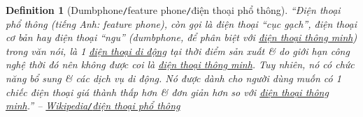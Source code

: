 \documentclass[12pt,twoside]{book}
\newtheorem{definition}{Definition}[section]
\begin{document}
\begin{definition}[Dumbphone{\tt/}feature phone{\tt/}điện thoại phổ thông]
	\label{def: dumbphone}
	``\emph{Điện thoại phổ thông} (tiếng Anh: \emph{feature phone}), còn gọi là điện thoại ``cục gạch'', điện thoại cơ bản hay điện thoại ``ngu'' (\emph{dumbphone}, để phân biệt với \href{https://vi.wikipedia.org/wiki/%C4%90i%E1%BB%87n_tho%E1%BA%A1i_th%C3%B4ng_minh}{điện thoại thông minh}) trong văn nói, là 1 \href{https://vi.wikipedia.org/wiki/%C4%90i%E1%BB%87n_tho%E1%BA%A1i_di_%C4%91%E1%BB%99ng}{điện thoại di động} tại thời điểm sản xuất \& do giới hạn công nghệ thời đó nên không được coi là \href{https://vi.wikipedia.org/wiki/%C4%90i%E1%BB%87n_tho%E1%BA%A1i_th%C3%B4ng_minh}{điện thoại thông minh}. Tuy nhiên, nó có chức năng bổ sung \& các dịch vụ di động. Nó được dành cho người dùng muốn có 1 chiếc điện thoại giá thành thấp hơn \& đơn giản hơn so với \href{https://vi.wikipedia.org/wiki/%C4%90i%E1%BB%87n_tho%E1%BA%A1i_th%C3%B4ng_minh}{điện thoại thông minh}.'' -- \href{https://vi.wikipedia.org/wiki/%C4%90i%E1%BB%87n_tho%E1%BA%A1i_ph%E1%BB%95_th%C3%B4ng}{Wikipedia\emph{{\tt/}}điện thoại phổ thông}
\end{definition}
\end{document}
